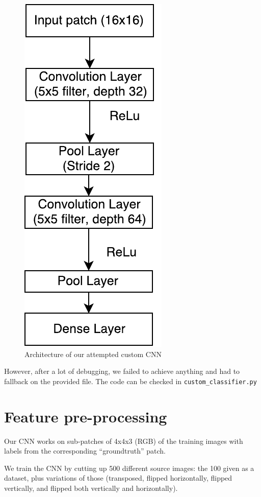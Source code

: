 \documentclass[11pt,conference,compsocconf]{IEEEtran}
\begin{document}
\begin{figure}[h]
\centering
\includegraphics[height=0.5\textheight,keepaspectratio]{custom_CNN.pdf}
\caption{Architecture of our attempted custom CNN}
\label{fig:custom_CNN}
\end{figure}

However, after a lot of debugging, we failed to achieve anything and had to fallback on the provided file. The code can be checked in \texttt{custom\_classifier.py}

\section{Feature pre-processing}

Our CNN works on sub-patches of 4x4x3 (RGB) of the training images with labels from the corresponding ``groundtruth'' patch.

We train the CNN by cutting up 500 different source images: the 100 given as a dataset, plus variations of those (transposed, flipped horizontally, flipped vertically, and flipped both vertically and horizontally).
\end{document}
